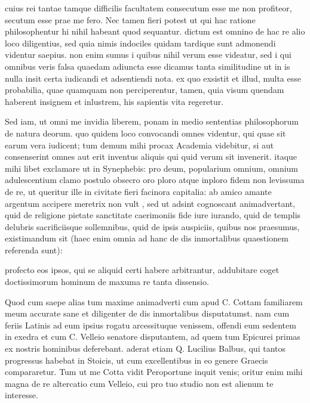  cuius rei tantae tamque difficilis facultatem consecutum esse me non profiteor, secutum esse prae me fero. Nec tamen fieri potest ut qui hac ratione philosophentur hi nihil habeant quod sequantur. dictum est omnino de hac re alio loco diligentius, sed quia nimis indociles quidam tardique sunt admonendi videntur saepius. non enim sumus i quibus nihil verum esse videatur, sed i qui omnibus veris falsa quaedam adiuncta esse dicamus tanta similitudine ut in is nulla insit certa iudicandi et adsentiendi nota. ex quo exsistit et illud, multa esse probabilia, quae quamquam non perciperentur, tamen, quia visum quendam haberent insignem et inlustrem, his sapientis vita regeretur.

 Sed iam, ut omni me invidia liberem, ponam in medio sententias philosophorum de natura deorum. quo quidem loco convocandi omnes videntur, qui quae sit earum vera iudicent; tum demum mihi procax Academia videbitur, si aut consenserint omnes aut erit inventus aliquis qui quid verum sit invenerit. itaque mihi libet exclamare ut in Synephebis: pro deum, popularium omnium, omnium adulescentium clamo postulo obsecro oro ploro atque inploro fidem non levissuma de re, ut queritur ille in civitate fieri facinora capitalia: ab amico amante argentum accipere meretrix non vult , sed ut adsint cognoscant animadvertant, quid de religione pietate sanctitate caerimoniis fide iure iurando, quid de templis delubris sacrificiisque sollemnibus, quid de ipsis auspiciis, quibus nos praesumus, existimandum sit (haec enim omnia ad hanc de dis inmortalibus quaestionem referenda sunt):

 profecto eos ipsos, qui se aliquid certi habere arbitrantur, addubitare coget doctissimorum hominum de maxuma re tanta dissensio.

 Quod cum saepe alias tum maxime animadverti cum apud C. Cottam familiarem meum accurate sane et diligenter de dis inmortalibus disputatumst. nam cum feriis Latinis ad eum ipsius rogatu arcessituque venissem, offendi eum sedentem in exedra et cum C. Velleio senatore disputantem, ad quem tum Epicurei primas ex nostris hominibus deferebant. aderat etiam Q. Lucilius Balbus, qui tantos progressus habebat in Stoicis, ut cum excellentibus in eo genere Graecis compararetur. Tum ut me Cotta vidit Peroportune inquit venis; oritur enim mihi magna de re altercatio cum Velleio, cui pro tuo studio non est alienum te interesse.


